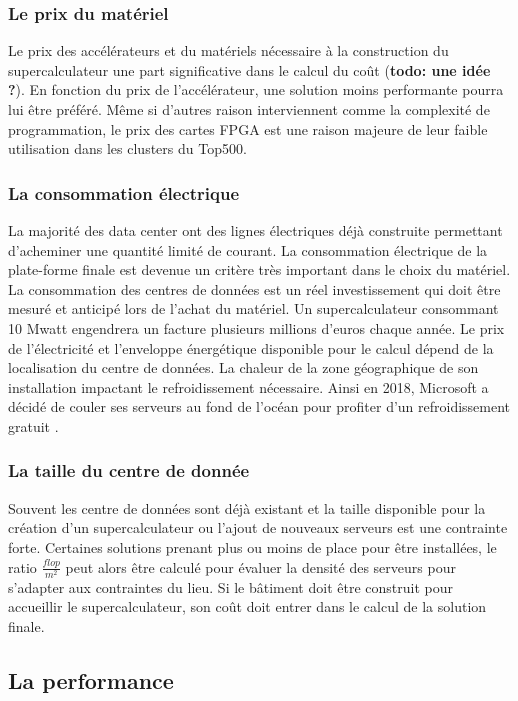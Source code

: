 \subsubsection{Le prix du matériel} 
Le  prix des accélérateurs et du matériels nécessaire à la construction du supercalculateur une part significative dans le calcul du coût (\textbf{todo: une idée ?}). En fonction du prix de l'accélérateur, une solution moins performante pourra lui être préféré. Même si d'autres raison interviennent comme la complexité de programmation, le prix des cartes FPGA est une raison majeure de leur faible utilisation dans les clusters du Top500.

\subsubsection{La consommation électrique}
La majorité des data center ont des lignes électriques déjà construite permettant d’acheminer une quantité limité de courant. La consommation électrique de la plate-forme finale est devenue un critère très important dans le choix du matériel. La consommation des centres de données est un réel investissement qui doit être mesuré et anticipé lors de l'achat du matériel. Un supercalculateur consommant 10 Mwatt engendrera un facture plusieurs millions d'euros chaque année. Le prix de l'électricité et l'enveloppe énergétique disponible pour le calcul dépend de la localisation du centre de données. La chaleur de la zone géographique de son installation impactant le refroidissement nécessaire. Ainsi en 2018, Microsoft a décidé de couler ses serveurs au fond de l'océan pour profiter d'un refroidissement gratuit \cite{ChristineHall2018}.

\subsubsection{La taille du centre de donnée} 
Souvent les centre de données sont déjà existant et la taille disponible pour la création d'un supercalculateur ou l'ajout de nouveaux serveurs est une contrainte forte. Certaines solutions prenant plus ou moins de place pour être installées, le ratio $\frac{flop}{m^2}$ peut alors être calculé pour évaluer la densité des serveurs pour s'adapter aux contraintes du lieu. Si le bâtiment doit être construit pour accueillir le supercalculateur, son coût doit entrer dans le calcul de la solution finale.




\subsection{La performance}


